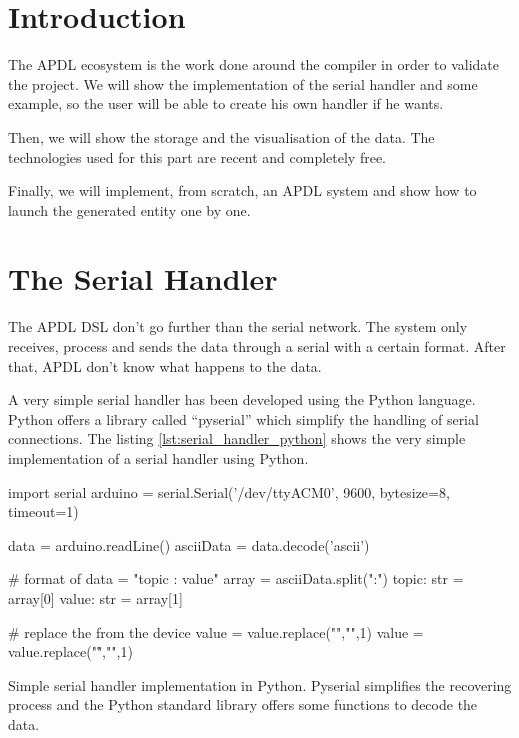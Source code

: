 
\section{Introduction}
\label{sec:apdl_ecosystem_intro}

The APDL ecosystem is the work done around the compiler in order to validate the
project. We will show the implementation of the serial handler and some example,
so the user will be able to create his own handler if he wants.

Then, we will show the storage and the visualisation of the data. The
technologies used for this part are recent and completely free.

Finally, we will implement, from scratch, an \gls{APDL} system and show how to
launch the generated entity one by one.

\section{The Serial Handler}
\label{sec:serial_handler}

The \gls{APDL} \gls{DSL} don't go further than the serial network. The system
only receives, process and sends the data through a serial with a certain
format. After that, \gls{APDL} don't know what happens to the data.

A very simple serial handler has been developed using the Python language. Python
offers a library called ``pyserial'' which simplify the handling of serial
connections. The listing \ref{lst:serial_handler_python} shows the very simple
implementation of a serial handler using Python.

\begin{listing}[H]
  \centering
\begin{pythoncode}
import serial
arduino = serial.Serial('/dev/ttyACM0', 9600, bytesize=8, timeout=1)

data = arduino.readLine()
asciiData = data.decode('ascii')

# format of data = "topic : value"
array = asciiData.split(":")
topic: str = array[0]
value: str = array[1]

# replace the \n from the device
value = value.replace("\n","",1)
value = value.replace("\r","",1)
\end{pythoncode}
  \caption[Simple serial handler implementation in Python]{Simple serial handler
implementation in Python. Pyserial simplifies the recovering process and the
Python standard library offers some functions to decode the data.}
  \label{lst:serial_handler_python}
\end{listing}

